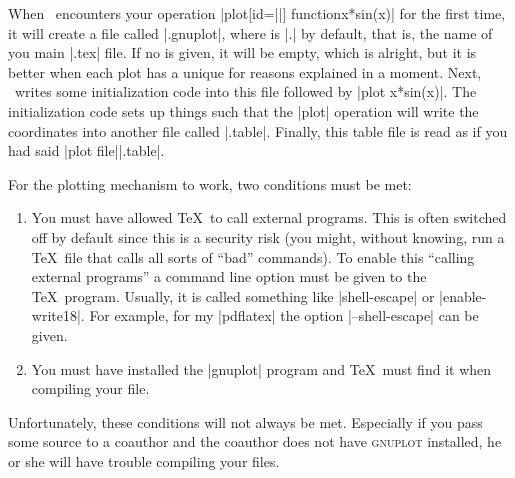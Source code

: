 When \tikzname\ encounters your operation
|plot[id=||] function{x*sin(x)}| for 
the first time, it will create a file called
|.gnuplot|, where  is |\jobname.| by
default, that is, the name of you main |.tex| file. If no  is
given, it will be empty, which is alright, but it is better when each
plot has a unique  for reasons explained in a moment. Next,
\tikzname\ writes some initialization code into this file followed by
|plot x*sin(x)|. The initialization code sets up things 
such that the |plot| operation will write the coordinates into another
file called |.table|. Finally, this table file
is read as if you had said |plot file{||.table}|. 

For the plotting mechanism to work, two conditions must be met:
\begin{enumerate}
\item
  You must have allowed \TeX\ to call external programs. This is often
  switched off by default since this is a security risk (you might,
  without knowing, run a \TeX\ file that calls all sorts of ``bad''
  commands). To enable this ``calling external programs'' a command
  line option must be given to the \TeX\ program. Usually, it is
  called something like |shell-escape| or |enable-write18|. For
  example, for my |pdflatex| the option |--shell-escape| can be
  given.
\item
  You must have installed the |gnuplot| program and \TeX\ must find it
  when compiling your file.
\end{enumerate}

Unfortunately, these conditions will not always be met. Especially if
you pass some source to a coauthor and the coauthor does not have
\textsc{gnuplot} installed, he or she will have trouble compiling your
files.

